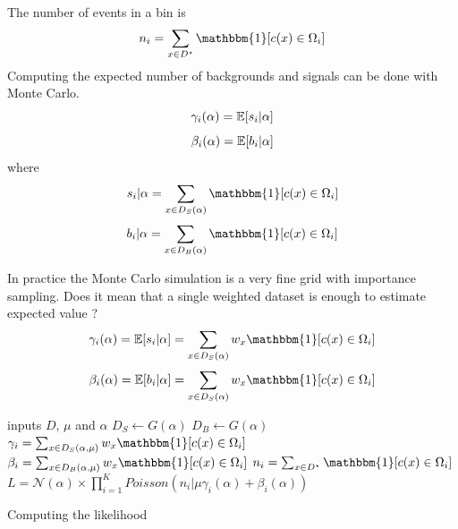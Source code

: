 The number of events in a bin is 
\begin{equation}
  n_i = \sum_{x \in D^\star} \mathbbm{1} [c(x)\in \Omega_i]
\end{equation}
Computing the expected number of backgrounds and signals can be done with Monte Carlo.
\begin{equation}
  \gamma_i(\alpha) = \mathbb{E}[s_i|\alpha]
\end{equation}
\begin{equation}
  \beta_i(\alpha) = \mathbb{E}[b_i|\alpha]
\end{equation}
where 
\begin{equation}
  s_i | \alpha = \sum_{x \in D_S(\alpha)} \mathbbm{1} [c(x)\in \Omega_i]
\end{equation}
\begin{equation}
  b_i | \alpha = \sum_{x \in D_B(\alpha)} \mathbbm{1} [c(x)\in \Omega_i]
\end{equation}

In practice the Monte Carlo simulation is a very fine grid with importance sampling.
Does it mean that a single weighted dataset is enough to estimate expected value ?
\begin{equation}
  \gamma_i(\alpha) = \EE[s_i | \alpha] = \sum_{x \in D_S(\alpha)} w_x \mathbbm{1} [c(x)\in \Omega_i]
\end{equation}
\begin{equation}
  \beta_i(\alpha) = \EE[b_i | \alpha] = \sum_{x \in D_S(\alpha)} w_x \mathbbm{1} [c(x)\in \Omega_i]
\end{equation}


\begin{algorithm}[H]
 inputs $D$, $\mu$ and $\alpha$ \;
 $D_S \gets G(\alpha)$ \;
 $D_B \gets G(\alpha)$ \;
 $\gamma_i =  \sum_{x \in D_S(\alpha, \mu)} w_x \mathbbm{1} [c(x)\in \Omega_i] $ \;
 $\beta_i =  \sum_{x \in D_B(\alpha, \mu)} w_x \mathbbm{1} [c(x)\in \Omega_i] $ \;
 $n_i = \sum_{x \in D^\star} \mathbbm{1} [c(x)\in \Omega_i]$ \;
 $L = \mathcal N (\alpha) \times \prod_{i=1}^K Poisson(n_i | \mu \gamma_i(\alpha) + \beta_i(\alpha) )$ \;
\caption{Computing the likelihood}
\end{algorithm}



